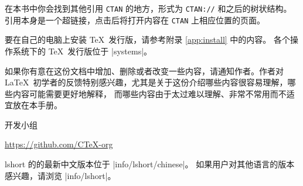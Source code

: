 在本书中你会找到其他引用 \texttt{CTAN} 的地方，形式为 \texttt{CTAN://} 和之后的树状结构。
引用本身是一个超链接，点击后将打开内容在 \texttt{CTAN} 上相应位置的页面。

要在自己的电脑上安装 \TeX\ 发行版，请参考附录 \ref{app:install} 中的内容。
各个操作系统下的 \TeX\ 发行版位于 \CTAN|systems|。

\bigskip
如果你有意在这份文档中增加、删除或者改变一些内容，请通知作者。作者对 \LaTeX\
初学者的反馈特别感兴趣，尤其是关于这份介绍哪些内容很容易理解，哪些内容可能需要更好地解释，
而哪些内容由于太过难以理解、非常不常用而不适宜放在本手册。

\bigskip
\begin{flushright}
 开发小组\par
\url{https://github.com/CTeX-org}
\end{flushright}

\vfill

\noindent\begingroup\small lshort 的的最新中文版本位于 \CTAN|info/lshort/chinese|。
如果用户对其他语言的版本感兴趣，请浏览 \CTAN|info/lshort|。\endgroup

\endinput
